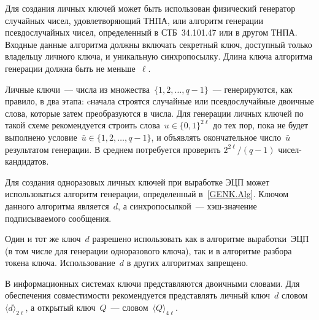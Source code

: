 Для создания личных ключей может быть использован 
физический генератор случайных чисел, удовлетворяющий ТНПА,
или алгоритм генерации псевдослучайных чисел,
определенный в СТБ~34.101.47 или в другом ТНПА. 
Входные данные алгоритма должны включать секретный ключ,
доступный только владельцу личного ключа, и уникальную 
синхропосылку. Длина ключа алгоритма генерации должна быть не меньше~$\ell$.

\begin{note*}
Личные ключи~--- числа из множества~$\{1,2,\ldots,q-1\}$~--- 
генерируются, как правило, в два этапа: cначала строятся случайные 
или псевдослучайные двоичные слова, которые затем преобразуются в числа. 
Для генерации личных ключей по такой схеме 
рекомендуется строить слова~$u\in\{0,1\}^{2\ell}$ до тех пор, 
пока не будет выполнено условие~$\bar{u}\in\{1,2,\ldots,q-1\}$,
и объявлять окончательное число~$\bar{u}$ результатом генерации.
В среднем потребуется проверить $2^{2\ell}/(q-1)$ чисел-кандидатов.
\end{note*}

%                                     

Для создания одноразовых личных ключей при выработке ЭЦП 
может использоваться алгоритм генерации, 
определенный в~\ref{GENK.Alg}.
%
Ключом данного алгоритма является~$d$,
а синхропосылкой~--- хэш-значение подписываемого сообщения.
  

Один и тот же ключ~$d$ разрешено использовать как в алгоритме выработки~ЭЦП 
(в том числе для генерации одноразового ключа), 
так и в алгоритме разбора токена ключа.
Использование~$d$ в других алгоритмах запрещено.

В информационных системах ключи представляются двоичными словами.
Для обеспечения совместимости рекомендуется представлять
личный ключ~$d$ словом~$\langle d\rangle_{2\ell}$,
а открытый ключ~$Q$~--- словом~$\langle Q\rangle_{4\ell}$.

